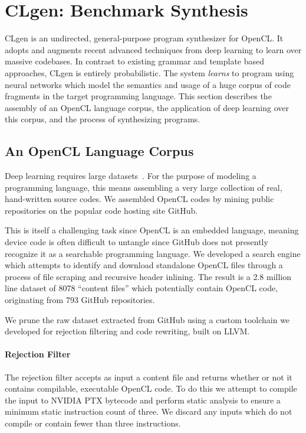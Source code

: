 \section{CLgen: Benchmark Synthesis}%
\label{sec:lang-corpus}

CLgen is an undirected, general-purpose program synthesizer for OpenCL. It adopts and augments recent advanced techniques from deep learning to learn over massive codebases. In contrast to existing grammar and template based approaches, CLgen is entirely probabilistic. The system \emph{learns} to program using neural networks which model the semantics and usage of a huge corpus of code fragments in the target programming language. This section describes the assembly of an OpenCL language corpus, the application of deep learning over this corpus, and the process of synthesizing programs.

\subsection{An OpenCL Language Corpus}

Deep learning requires large datasets~\cite{LeCun2015}. For the purpose of modeling a programming language, this means assembling a very large collection of real, hand-written source codes. We assembled OpenCL codes by mining public repositories on the popular code hosting site GitHub.

This is itself a challenging task since OpenCL is an embedded language, meaning device code is often difficult to untangle since GitHub does not presently recognize it as a searchable programming language. We developed a search engine which attempts to identify and download standalone OpenCL files through a process of file scraping and recursive header inlining. The result is a 2.8 million line dataset of 8078 ``content files'' which potentially contain OpenCL code, originating from 793 GitHub repositories.

We prune the raw dataset extracted from GitHub using a custom toolchain we developed for rejection filtering and code rewriting, built on LLVM.

\paragraph{Rejection Filter}\label{sec:rejection-filter} The rejection filter accepts as input a content file and returns whether or not it contains compilable, executable OpenCL code. To do this we attempt to compile the input to NVIDIA PTX bytecode and perform static analysis to ensure a minimum static instruction count of three. We discard any inputs which do not compile or contain fewer than three instructions.

